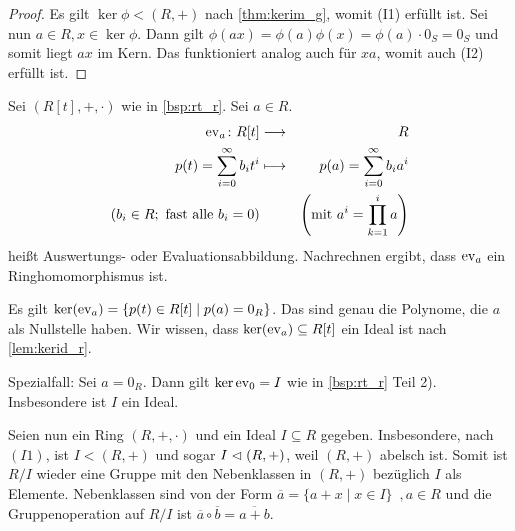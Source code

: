 \documentclass[12pt,a4paper]{scrartcl}
\begin{document}
\begin{proof}
	Es gilt $\ker \phi<(R,+)$ nach \cref{thm:kerim_g}, womit (I1) erfüllt ist. Sei nun $a\in R, x\in\ker \phi$. Dann gilt $\phi(ax) = \phi(a)\phi(x) = \phi(a)\cdot 0_S = 0_S$ und somit liegt $ax$ im Kern. Das funktioniert analog auch für $xa$, womit auch (I2) erfüllt ist.
\end{proof}

\begin{bsp}
	Sei $(R[t],+,\cdot)$ wie in \cref{bsp:rt_r}. Sei $a\in R$.\begin{eqnarray*}
		\operatorname{ev}_a\colon R[t] & \longrightarrow & R\\
		p(t) = \sum_{i=0}^{\infty}b_it^i & \longmapsto & p(a) = \sum_{i=0}^{\infty} b_ia^i\\
		(b_i\in R; \text{ fast alle $b_i = 0$})&&\left(\text{mit }a^i = \prod_{k=1}^ia\right)
	\end{eqnarray*}
	heißt Auswertungs- oder Evaluationsabbildung. Nachrechnen ergibt, dass $\operatorname{ev}_a$ ein Ringhomomorphismus ist.
	
	Es gilt $\operatorname{ker} (\operatorname{ev}_a) = \{p(t)\in R[t]\mid p(a) = 0_R\}$. Das sind genau die Polynome, die $a$ als Nullstelle haben. Wir wissen, dass $\operatorname{ker} (\operatorname{ev}_a) \subseteq R[t]$ ein Ideal ist nach \cref{lem:kerid_r}.
	
	Spezialfall: Sei $a = 0_R$. Dann gilt $\operatorname{ker} \operatorname{ev}_0  = I$ wie in \cref{bsp:rt_r} Teil 2). Insbesondere ist $I$ ein Ideal.
\end{bsp}

\begin{bem}
Seien nun ein Ring $(R,+,\cdot)$ und ein Ideal $I\subseteq R$ gegeben. Insbesondere, nach $(I1)$, ist $I<(R,+)$ und sogar $I\vartriangleleft (R,+)$, weil $(R,+)$ abelsch ist.
Somit ist $R/I$ wieder eine Gruppe mit den Nebenklassen in $(R,+)$ bezüglich $I$ als Elemente. Nebenklassen sind von der Form $\overline{a} = \{a+x\mid x\in I\}\enspace, a\in R$ und die Gruppenoperation auf $R/I$ ist $\overline{a}\circ\overline{b} = \overline{a+b}$.
\end{bem}
\end{document}
